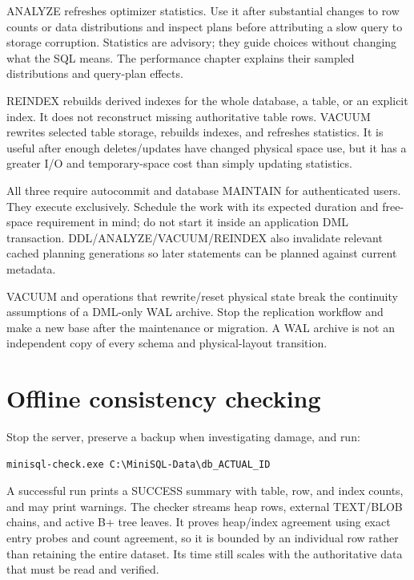 ANALYZE refreshes optimizer statistics. Use it after substantial changes to
row counts or data distributions and inspect plans before attributing a slow
query to storage corruption. Statistics are advisory; they guide choices
without changing what the SQL means. The performance chapter explains their
sampled distributions and query-plan effects.

REINDEX rebuilds derived indexes for the whole database, a table, or an
explicit index. It does not reconstruct missing authoritative table rows.
VACUUM rewrites selected table storage, rebuilds indexes, and refreshes
statistics. It is useful after enough deletes/updates have changed physical
space use, but it has a greater I/O and temporary-space cost than simply
updating statistics.

All three require autocommit and database MAINTAIN for authenticated users.
They execute exclusively. Schedule the work with its expected duration and
free-space requirement in mind; do not start it inside an application DML
transaction. DDL/ANALYZE/VACUUM/REINDEX also invalidate relevant cached
planning generations so later statements can be planned against current
metadata.

VACUUM and operations that rewrite/reset physical state break the continuity
assumptions of a DML-only WAL archive. Stop the replication workflow and make
a new base after the maintenance or migration. A WAL archive is not an
independent copy of every schema and physical-layout transition.


\section{Offline consistency checking}

Stop the server, preserve a backup when investigating damage, and run:

\begin{lstlisting}
minisql-check.exe C:\MiniSQL-Data\db_ACTUAL_ID
\end{lstlisting}

A successful run prints a SUCCESS summary with table, row, and index counts,
and may print warnings. The checker streams heap rows, external TEXT/BLOB
chains, and active B+ tree leaves. It proves heap/index agreement using exact
entry probes and count agreement, so it is bounded by an individual row
rather than retaining the entire dataset. Its time still scales with the
authoritative data that must be read and verified.

